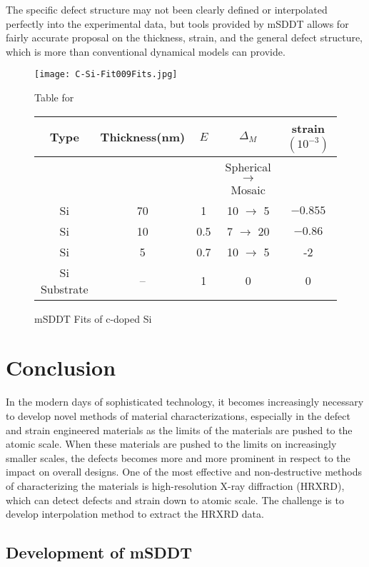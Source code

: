 The specific defect structure may not been clearly defined or interpolated perfectly into the experimental data, but tools provided by mSDDT allows for fairly accurate proposal on the thickness, strain, and the general defect structure, which is more than conventional dynamical models can provide.


\begin{figure}[h]
\caption{mSDDT Fits of c-doped Si}
\label{C-SiFits}
\texttt{[image: C-Si-Fit009Fits.jpg]}
\begin{minipage}{\linewidth}
\centering
\vspace{10pt}
Table for \\
\begin{tabular}[htbp]{@{}c|cccc@{}}
    \hline
  Type & Thickness(nm) & $E$ & $\Delta_M$ & strain $(10^{-3})$ \\
    \hline
	&			&  & Spherical $\rightarrow$ Mosaic & \\
\hline
  Si 	&	70	& 	1	 &	10 $\rightarrow$ 5	& $-0.855$  \\
  Si & 	10	& 	0.5	&	7  $\rightarrow$ 20 & $-0.86$  \\
Si	& 	5 	& 	0.7	&	10 $\rightarrow$ 5 &-2\\
  Si Substrate & -- & 1 & 0 & 0
  \end{tabular}
\end{minipage}
\end{figure}


\chapter{Conclusion}

In the modern days of sophisticated technology,  it becomes increasingly necessary to develop novel methods of material characterizations, especially in the defect and strain engineered materials as the limits of the materials are pushed to the atomic scale.  When these materials are pushed to the limits on increasingly smaller scales, the defects becomes more and more prominent in respect to the impact on overall designs.  One of the most effective and non-destructive methods of characterizing the materials is high-resolution X-ray diffraction (HRXRD), which can detect defects and strain down to atomic scale.  The challenge is to develop interpolation method to extract the HRXRD data.

\section{Development of mSDDT}

